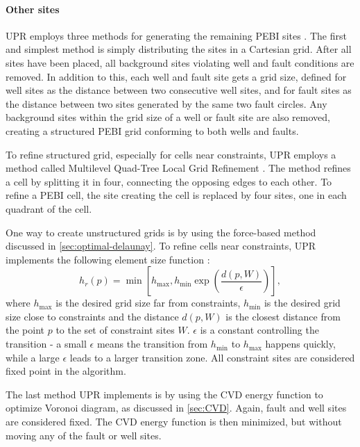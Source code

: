 \paragraph{Other sites}
UPR employs three methods for generating the remaining PEBI sites \cite{UPR_thesis}. The first and simplest method is simply distributing the sites in a Cartesian grid. After all sites have been placed, all background sites violating well and fault conditions are removed. In addition to this, each well and fault site gets a grid size, defined for well sites as the distance between two consecutive well sites, and for fault sites as the distance between two sites generated by the same two fault circles. Any background sites within the grid size of a well or fault site are also removed, creating a structured PEBI grid conforming to both wells and faults.

To refine structured grid, especially for cells near constraints, UPR employs a method called Multilevel Quad-Tree Local Grid Refinement \cite[pp.49]{UPR_thesis}. The method refines a cell by splitting it in four, connecting the opposing edges to each other. To refine a PEBI cell, the site creating the cell is replaced by four sites, one in each quadrant of the cell.

One way to create unstructured grids is by using the force-based method discussed in \autoref{sec:optimal-delaunay}. To refine cells near constraints, UPR implements the following element size function \cite[Equation 4.2]{UPR_thesis}:
\begin{equation}
    h_r(p) = \min \left[
        h_{\max}, h_{\min} \exp \left(
            \frac{d(p, W)}{\epsilon}
        \right) \right],
\end{equation}
where $h_{\max}$ is the desired grid size far from constraints, $h_{\min}$ is the desired grid size close to constraints and the distance $d(p, W)$ is the closest distance from the point $p$ to the set of constraint sites $W$. $\epsilon$ is a constant controlling the transition - a small $\epsilon$ means the transition from $h_{\min}$ to $h_{\max}$ happens quickly, while a large $\epsilon$ leads to a larger transition zone. All constraint sites are considered fixed point in the algorithm.

The last method UPR implements is by using the CVD energy function to optimize Voronoi diagram, as discussed in \autoref{sec:CVD}. Again, fault and well sites are considered fixed. The CVD energy function is then minimized, but without moving any of the fault or well sites.

